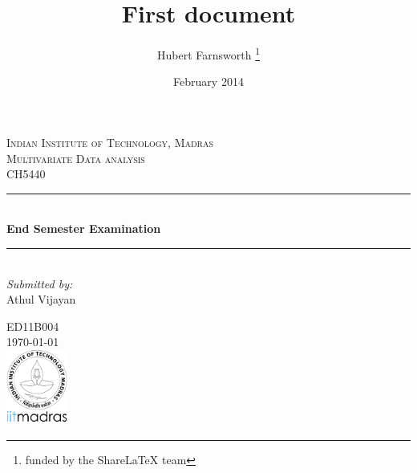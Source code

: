 \documentclass{article}
\title{First document}
\author{Hubert Farnsworth \thanks{funded by the ShareLaTeX team}}
\date{February 2014}
\begin{document}
\newcommand{\HRule}{\rule{\linewidth}{0.2mm}} %
\begin{titlepage}
\center %
 

\textsc{\LARGE Indian Institute of Technology, Madras}\\[1.5cm] %
\textsc{\Large Multivariate Data analysis}\\[0.5cm] %
\textsc{\large CH5440}\\[0.5cm] %


\HRule \\[0.4cm]
{ \huge \bfseries End Semester Examination}\\[0.4cm] %
\HRule \\[1.5cm]
 


\Large \emph{Submitted by:}\\
Athul Vijayan %

ED11B004\\[3cm] %


{\large \today}\\[6cm] %
\raggedleft
\includegraphics[width=2cm]{logo.png}

\vfill %
\end{titlepage}
\end{document}
